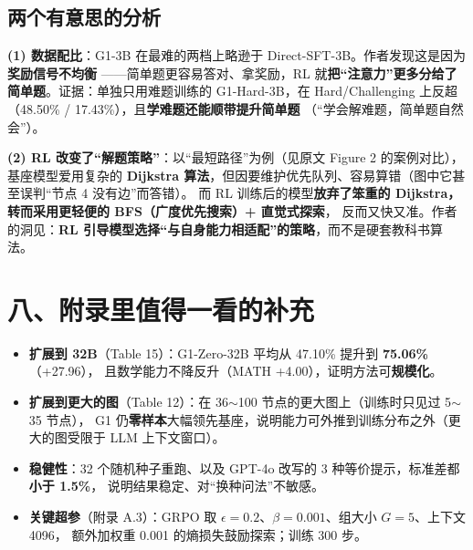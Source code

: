 \documentclass[11pt,UTF8,fontset=fandol]{ctexart}
\begin{document}
\subsection{两个有意思的分析}

\textbf{(1) 数据配比}：G1-3B 在最难的两档上略逊于 Direct-SFT-3B。作者发现这是因为\textbf{奖励信号不均衡}
——简单题更容易答对、拿奖励，RL 就\textbf{把“注意力”更多分给了简单题}。证据：单独只用难题训练的
G1-Hard-3B，在 Hard/Challenging 上反超（48.50\% / 17.43\%），且\textbf{学难题还能顺带提升简单题}
（“学会解难题，简单题自然会”）。

\textbf{(2) RL 改变了“解题策略”}：以“最短路径”为例（见原文 Figure 2 的案例对比），基座模型爱用复杂的
\textbf{Dijkstra 算法}，但因要维护优先队列、容易算错（图中它甚至误判“节点 4 没有边”而答错）。
而 RL 训练后的模型\textbf{放弃了笨重的 Dijkstra，转而采用更轻便的 BFS（广度优先搜索）+ 直觉式探索}，
反而又快又准。作者的洞见：\textbf{RL 引导模型选择“与自身能力相适配”的策略}，而不是硬套教科书算法。

\section{八、附录里值得一看的补充}
\begin{itemize}[leftmargin=2em]
  \item \textbf{扩展到 32B}（Table 15）：G1-Zero-32B 平均从 47.10\% 提升到 \textbf{75.06\%}（+27.96），
        且数学能力不降反升（MATH +4.00），证明方法可\textbf{规模化}。
  \item \textbf{扩展到更大的图}（Table 12）：在 36$\sim$100 节点的更大图上（训练时只见过 5$\sim$35 节点），
        G1 仍\textbf{零样本}大幅领先基座，说明能力可外推到训练分布之外（更大的图受限于 LLM 上下文窗口）。
  \item \textbf{稳健性}：32 个随机种子重跑、以及 GPT-4o 改写的 3 种等价提示，标准差都\textbf{小于 1.5\%}，
        说明结果稳定、对“换种问法”不敏感。
  \item \textbf{关键超参}（附录 A.3）：GRPO 取 $\epsilon=0.2$、$\beta=0.001$、组大小 $G=5$、上下文 4096，
        额外加权重 0.001 的熵损失鼓励探索；训练 300 步。
\end{itemize}
\end{document}

